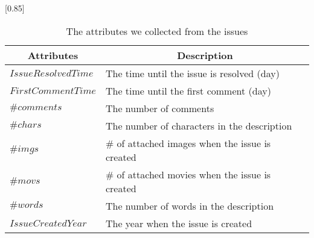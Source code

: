 
\begin{table}[t]
    \begin{center}
    \caption{The attributes we collected from the issues}
    \scalebox{0.85}[0.85]{
    \begin{tabular}{ll} 
        \toprule
        \multicolumn{1}{c}{\textbf{Attributes}} & \multicolumn{1}{c}{\textbf{Description}} \\ 
        \midrule
        $IssueResolvedTime$ & The time until the issue is resolved (day) \\
        $FirstCommentTime$ & The time until the first comment (day) \\
        $\#comments$ & The number of comments \\
        $\#chars$ & The number of characters in the description \\
        $\#imgs$ & \# of attached images when the issue is created \\
        $\#movs$ & \# of attached movies when the issue is created \\
        $\#words$ &  The number of words in the description \\
        $IssueCreatedYear$ & The year when the issue is created \\
        \bottomrule
    \end{tabular}
    }
    \label{tab:issue-attr}
    \end{center}
\end{table}
